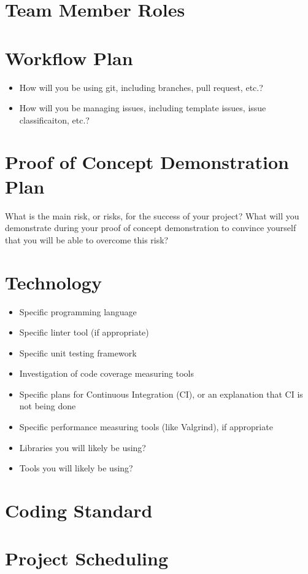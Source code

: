 \documentclass{article}
\begin{document}
\section{Team Member Roles}

\section{Workflow Plan}

\begin{itemize}
	\item How will you be using git, including branches, pull request, etc.?
	\item How will you be managing issues, including template issues, issue
	classificaiton, etc.?
\end{itemize}

\section{Proof of Concept Demonstration Plan}

What is the main risk, or risks, for the success of your project?  What will you
demonstrate during your proof of concept demonstration to convince yourself that
you will be able to overcome this risk?

\section{Technology}

\begin{itemize}
\item Specific programming language
\item Specific linter tool (if appropriate)
\item Specific unit testing framework
\item Investigation of code coverage measuring tools
\item Specific plans for Continuous Integration (CI), or an explanation that CI
  is not being done
\item Specific performance measuring tools (like Valgrind), if
  appropriate
\item Libraries you will likely be using?
\item Tools you will likely be using?
\end{itemize}

\section{Coding Standard}

\section{Project Scheduling}

\end{document}

